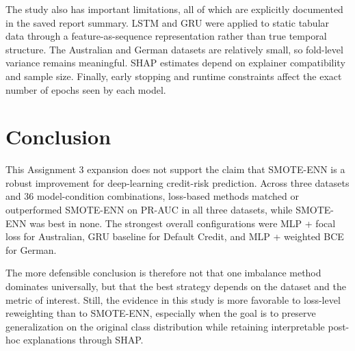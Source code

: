\documentclass[11pt,a4paper]{article}
\begin{document}
The study also has important limitations, all of which are explicitly documented in the saved report summary. LSTM and GRU were applied to static tabular data through a feature-as-sequence representation rather than true temporal structure. The Australian and German datasets are relatively small, so fold-level variance remains meaningful. SHAP estimates depend on explainer compatibility and sample size. Finally, early stopping and runtime constraints affect the exact number of epochs seen by each model.

\section{Conclusion}
This Assignment 3 expansion does not support the claim that SMOTE-ENN is a robust improvement for deep-learning credit-risk prediction. Across three datasets and 36 model-condition combinations, loss-based methods matched or outperformed SMOTE-ENN on PR-AUC in all three datasets, while SMOTE-ENN was best in none. The strongest overall configurations were MLP + focal loss for Australian, GRU baseline for Default Credit, and MLP + weighted BCE for German.

The more defensible conclusion is therefore not that one imbalance method dominates universally, but that the best strategy depends on the dataset and the metric of interest. Still, the evidence in this study is more favorable to loss-level reweighting than to SMOTE-ENN, especially when the goal is to preserve generalization on the original class distribution while retaining interpretable post-hoc explanations through SHAP.
\end{document}
